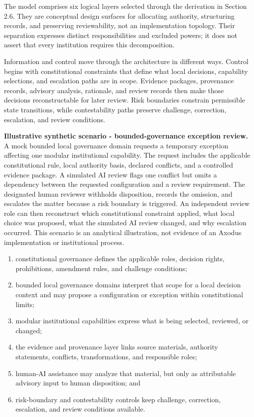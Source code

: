 \documentclass[11pt]{article}
\begin{document}
The model comprises six logical layers selected through the derivation in
Section 2.6. They are conceptual design surfaces for allocating authority,
structuring records, and preserving reviewability, not an implementation
topology. Their separation expresses distinct responsibilities and excluded
powers; it does not assert that every institution requires this decomposition.

Information and control move through the architecture in different ways.
Control begins with constitutional constraints that define what local
decisions, capability selections, and escalation paths are in scope.
Evidence packages, provenance records, advisory analysis, rationale, and
review records then make those decisions reconstructable for later review.
Risk boundaries constrain permissible state transitions, while contestability
paths preserve challenge, correction, escalation, and review conditions.

\noindent\textbf{Illustrative synthetic scenario - bounded-governance
exception review.} A mock bounded local governance domain requests a
temporary exception affecting one modular institutional capability. The
request includes the applicable constitutional rule, local authority basis,
declared conflicts, and a controlled evidence package. A simulated AI review
flags one conflict but omits a dependency between the requested
configuration and a review requirement. The designated human reviewer
withholds disposition, records the omission, and escalates the matter because
a risk boundary is triggered. An independent review role can then reconstruct
which constitutional constraint applied, what local choice was proposed, what
the simulated AI review changed, and why escalation occurred. This scenario
is an analytical illustration, not evidence of an Axodus implementation or
institutional process.

\begin{enumerate}
\item constitutional governance defines the applicable roles, decision
rights, prohibitions, amendment rules, and challenge conditions;
\item bounded local governance domains interpret that scope for a local
decision context and may propose a configuration or exception within
constitutional limits;
\item modular institutional capabilities express what is being selected,
reviewed, or changed;
\item the evidence and provenance layer links source materials, authority
statements, conflicts, transformations, and responsible roles;
\item human-AI assistance may analyze that material, but only as attributable
advisory input to human disposition; and
\item risk-boundary and contestability controls keep challenge, correction,
escalation, and review conditions available.
\end{enumerate}
\end{document}
